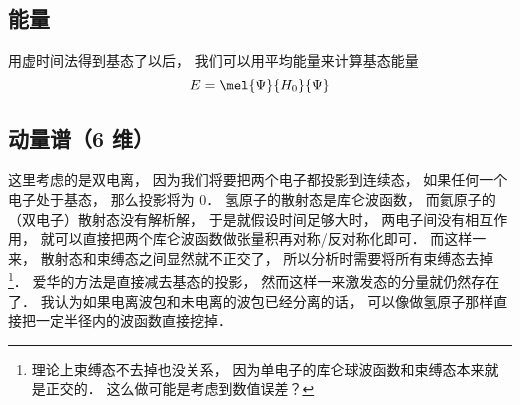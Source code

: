 

\subsection{能量}
用虚时间法得到基态了以后， 我们可以用平均能量来计算基态能量
\begin{equation}
E = \mel{\Psi}{H_0}{\Psi}
\end{equation}

\subsection{动量谱（6 维）}
这里考虑的是双电离， 因为我们将要把两个电子都投影到连续态， 如果任何一个电子处于基态， 那么投影将为 0． 氢原子的散射态是库仑波函数， 而氦原子的（双电子）散射态没有解析解， 于是就假设时间足够大时， 两电子间没有相互作用， 就可以直接把两个库仑波函数做张量积再对称/反对称化即可． 而这样一来， 散射态和束缚态之间显然就不正交了， 所以分析时需要将所有束缚态去掉\footnote{理论上束缚态不去掉也没关系， 因为单电子的库仑球波函数和束缚态本来就是正交的． 这么做可能是考虑到数值误差？}． 爱华的方法是直接减去基态的投影， 然而这样一来激发态的分量就仍然存在了． 我认为如果电离波包和未电离的波包已经分离的话， 可以像做氢原子那样直接把一定半径内的波函数直接挖掉．


